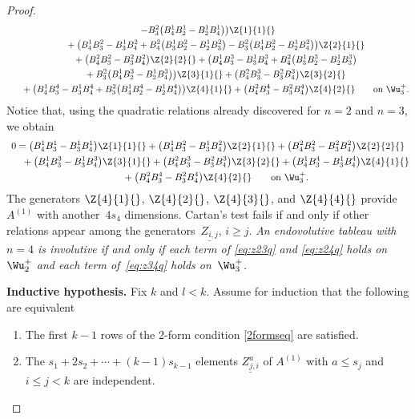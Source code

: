 \begin{proof}
\begin{gather*}
- B^{2}_{3}\big( B^{1}_{4}B^{1}_{2} - B^{1}_{2}B^{1}_{4}\big) \big)
\Z{1}{1}{}\\
 \phantom{0=}{}
+ \big( B^{1}_{4}B^{2}_{3} - B^{1}_{3}B^{2}_{4}
+ B^{2}_{4}\big(B^{1}_{3}B^{2}_{2} - B^{1}_{2}B^{2}_{3}\big)
- B^{2}_{3}\big(B^{1}_{4}B^{2}_{2} - B^{1}_{2}B^{2}_{4}\big)\big)
\Z{2}{1}{}\\
 \phantom{0=}{}
+ \big( B^{2}_{4}B^{2}_{3} - B^{2}_{3}B^{2}_{4}\big)\Z{2}{2}{}
+
\big( B^{1}_{4}B^{3}_{3} - B^{1}_{3}B^{3}_{4}
+ B^{2}_{4}\big( B^{1}_{3}B^{3}_{2} - B^{1}_{2}B^{3}_{3}\big)\\
 \phantom{0=}{}
+ B^{2}_{3}\big( B^{1}_{4}B^{3}_{2} - B^{1}_{2}B^{3}_{4}\big)
\big)\Z{3}{1}{}
+ \big(B^{2}_{4}B^{3}_{3} - B^{2}_{3}B^{3}_{4}\big)\Z{3}{2}{}  \\
 \phantom{0=}{}
+
\big(B^{1}_{4}B^{4}_{3} - B^{1}_{3}B^{4}_{4} + B^{2}_{3}
\big( B^{1}_{4}B^{4}_{2} - B^{1}_{2}B^{4}_{4}\big) \big)\Z{4}{1}{}
+
\big(B^{2}_{4}B^{4}_{3} - B^{2}_{3}B^{4}_{4}\big)\Z{4}{2}{} \qquad \text{on
$\Wu^+_3$}.
\end{gather*}
Notice that, using the quadratic relations already discovered for $n=2$ and
$n=3$, we obtain
\begin{gather}
0=
  \big(B^{1}_{4}B^{1}_{3} - B^{1}_{3}B^{1}_{4}\big)\Z{1}{1}{}
+ \big(B^{1}_{4}B^{2}_{3} - B^{1}_{3}B^{2}_{4}\big)\Z{2}{1}{}
+ \big(B^{2}_{4}B^{2}_{3} - B^{2}_{3}B^{2}_{4}\big)\Z{2}{2}{}
\nonumber\\
\phantom{0=}{}
+ \big(B^{1}_{4}B^{3}_{3} - B^{1}_{3}B^{3}_{4}\big)\Z{3}{1}{}+ \big(B^{2}_{4}B^{3}_{3} - B^{2}_{3}B^{3}_{4}\big)\Z{3}{2}{}
+ \big(B^{1}_{4}B^{4}_{3} - B^{1}_{3}B^{4}_{4}\big)\Z{4}{1}{} \nonumber\\
\phantom{0=}{}
+ \big(B^{2}_{4}B^{4}_{3} - B^{2}_{3}B^{4}_{4}\big)\Z{4}{2}{} \qquad \text{on
$\Wu^+_3$}.
\label{eq:z34q}
\end{gather}
The generators $\Z{4}{1}{}$, $\Z{4}{2}{}$, $\Z{4}{3}{}$, and $\Z{4}{4}{}$ provide
$A^{(1)}$ with another~$4s_4$ dimensions.
Cartan's test fails if and
only if other relations appear among the generators~$\underline{Z_{i,j}}$, $i
\geq j$.
 \emph{An endovolutive tableau with $n=4$ is involutive if and only if
each term of \eqref{eq:z23q} and \eqref{eq:z24q} holds on $\Wu^+_2$ and each term of~\eqref{eq:z34q} holds on~$\Wu^+_3$.}

\textbf{Inductive hypothesis.}
Fix $k$ and $l<k$.
Assume for induction that the following are equivalent
\begin{enumerate}\itemsep=0pt
\item The f\/irst $k-1$ rows of the 2-form condition \eqref{2formseq} are
satisf\/ied.
\item The $s_1 + 2s_2 + \cdots + (k-1)s_{k-1}$ elements $\underline{Z^a_{j,i}}$
of $A^{(1)}$ with $a \leq s_j$ and $i \leq j < k$ are independent.
\end{enumerate}


\end{proof}
